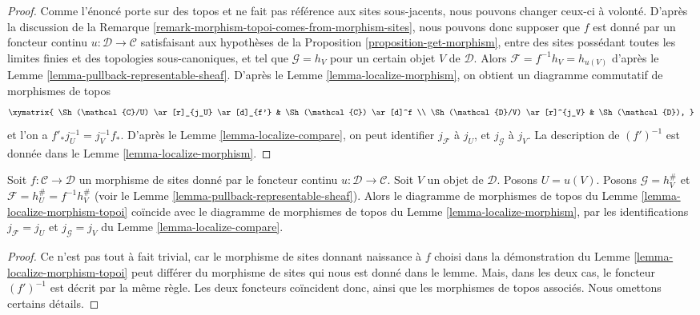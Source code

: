 \begin{proof}
Comme l’énoncé porte sur des topos et ne fait pas référence aux sites
sous-jacents, nous pouvons changer ceux-ci à volonté. D’après la discussion de
la Remarque \ref{remark-morphism-topoi-comes-from-morphism-sites}, nous pouvons
donc supposer que $f$ est donné par un foncteur continu
$u : \mathcal{D} \to \mathcal{C}$ satisfaisant aux hypothèses de la
Proposition \ref{proposition-get-morphism}, entre des sites possédant toutes
les limites finies et des topologies sous-canoniques, et tel que
$\mathcal{G} = h_V$ pour un certain objet $V$ de $\mathcal{D}$. Alors
$\mathcal{F} = f^{-1}h_V = h_{u(V)}$ d’après le
Lemme \ref{lemma-pullback-representable-sheaf}.
D’après le Lemme \ref{lemma-localize-morphism}, on obtient un diagramme
commutatif de morphismes de topos
$$
\xymatrix{
\Sh(\mathcal{C}/U) \ar[r]_{j_U} \ar[d]_{f'} &
\Sh(\mathcal{C}) \ar[d]^f \\
\Sh(\mathcal{D}/V) \ar[r]^{j_V} &
\Sh(\mathcal{D}),
}
$$
et l’on a $f'_*j_U^{-1} = j_V^{-1}f_*$. D’après le
Lemme \ref{lemma-localize-compare}, on peut identifier $j_\mathcal{F}$ à
$j_U$, et $j_\mathcal{G}$ à $j_V$. La description de $(f')^{-1}$ est donnée
dans le Lemme \ref{lemma-localize-morphism}.
\end{proof}

\begin{lemma}
\label{lemma-localize-morphism-compare}
Soit $f : \mathcal{C} \to \mathcal{D}$ un morphisme de sites donné par le
foncteur continu $u : \mathcal{D} \to \mathcal{C}$.
Soit $V$ un objet de $\mathcal{D}$. Posons $U = u(V)$.
Posons $\mathcal{G} = h_V^\#$ et
$\mathcal{F} = h_U^\# = f^{-1}h_V^\#$ (voir le
Lemme \ref{lemma-pullback-representable-sheaf}).
Alors le diagramme de morphismes de topos du
Lemme \ref{lemma-localize-morphism-topoi} coïncide avec le diagramme de
morphismes de topos du Lemme \ref{lemma-localize-morphism}, par les
identifications $j_\mathcal{F}= j_U$ et $j_\mathcal{G} = j_V$ du
Lemme \ref{lemma-localize-compare}.
\end{lemma}

\begin{proof}
Ce n’est pas tout à fait trivial, car le morphisme de sites donnant naissance
à $f$ choisi dans la démonstration du
Lemme \ref{lemma-localize-morphism-topoi} peut différer du morphisme de sites
qui nous est donné dans le lemme. Mais, dans les deux cas, le foncteur
$(f')^{-1}$ est décrit par la même règle. Les deux foncteurs coïncident donc,
ainsi que les morphismes de topos associés. Nous omettons certains détails.
\end{proof}

